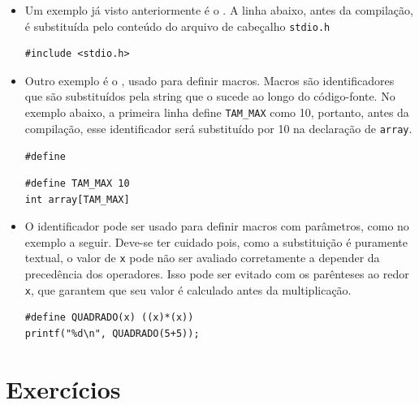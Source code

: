 \begin{itemize}

\item Um exemplo já visto anteriormente é o \INCLUDE. A linha abaixo, antes da compilação, é substituída pelo conteúdo do arquivo de cabeçalho {\tt stdio.h}

\begin{lstlisting}
#include <stdio.h>
\end{lstlisting}
 
\item Outro exemplo é o \DEFINE, usado para definir macros. Macros são identificadores que são substituídos pela string que o sucede ao longo do código-fonte. No exemplo abaixo, a primeira linha define {\tt TAM\_MAX} como 10, portanto, antes da compilação, esse identificador será substituído por 10 na declaração de {\tt array}.

{\tt \#define  }

\begin{lstlisting}
#define TAM_MAX 10
int array[TAM_MAX]
\end{lstlisting}

\item O identificador pode ser usado para definir macros com parâmetros, como no exemplo a seguir. Deve-se ter cuidado pois, como a substituição é puramente textual, o valor de {\tt x} pode não ser avaliado corretamente a depender da precedência dos operadores. Isso pode ser evitado com os parênteses ao redor {\tt x}, que garantem que seu valor é calculado antes da multiplicação.

\begin{lstlisting}
#define QUADRADO(x) ((x)*(x))
printf("%d\n", QUADRADO(5+5));
\end{lstlisting}

\end{itemize}


\section{Exercícios}

